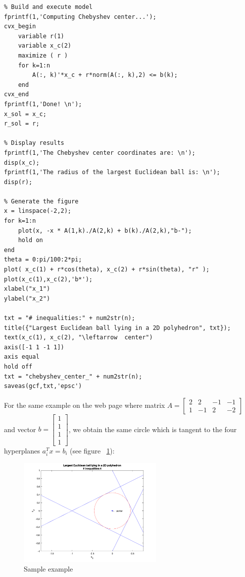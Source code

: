 \documentclass[10pt]{article}
\newcommand{\0}{\mat{0}}
\begin{document}
\begin{enumerate}
\begin{enumerate}
\begin{verbatim}
% Build and execute model
fprintf(1,'Computing Chebyshev center...');
cvx_begin
    variable r(1)
    variable x_c(2)
    maximize ( r )
    for k=1:n
        A(:, k)'*x_c + r*norm(A(:, k),2) <= b(k);
    end
cvx_end
fprintf(1,'Done! \n');
x_sol = x_c;
r_sol = r;

% Display results
fprintf(1,'The Chebyshev center coordinates are: \n');
disp(x_c);
fprintf(1,'The radius of the largest Euclidean ball is: \n');
disp(r);

% Generate the figure
x = linspace(-2,2);
for k=1:n
    plot(x, -x * A(1,k)./A(2,k) + b(k)./A(2,k),"b-");
    hold on
end
theta = 0:pi/100:2*pi;
plot( x_c(1) + r*cos(theta), x_c(2) + r*sin(theta), "r" );
plot(x_c(1),x_c(2),'b*');
xlabel("x_1")
ylabel("x_2")

txt = "# inequalities:" + num2str(n);
title({"Largest Euclidean ball lying in a 2D polyhedron", txt});
text(x_c(1), x_c(2), "\leftarrow  center")
axis([-1 1 -1 1])
axis equal
hold off
txt = "chebyshev_center_" + num2str(n);
saveas(gcf,txt,'epsc')

\end{verbatim}

For the same example on the web page where matrix $A=\begin{bmatrix} 2 &  2  & -1 & -1\\ 1 & -1 & 2  & -2 \end{bmatrix}$ and vector $b=\begin{bmatrix} 1\\ 1 \\ 1 \\ 1 \end{bmatrix}$,
we obtain the same circle which is tangent to the four hyperplanes $a_i^T x = b_i$ (see figure ~\ref{fig1}):
\begin{figure}[H]
	\centering
	\includegraphics[width=200pt]{figures/chebyshev_center_4}
	\caption{Sample example}
	\label{fig1}
\end{figure}
     


\end{enumerate}
\end{enumerate}
\end{document}
